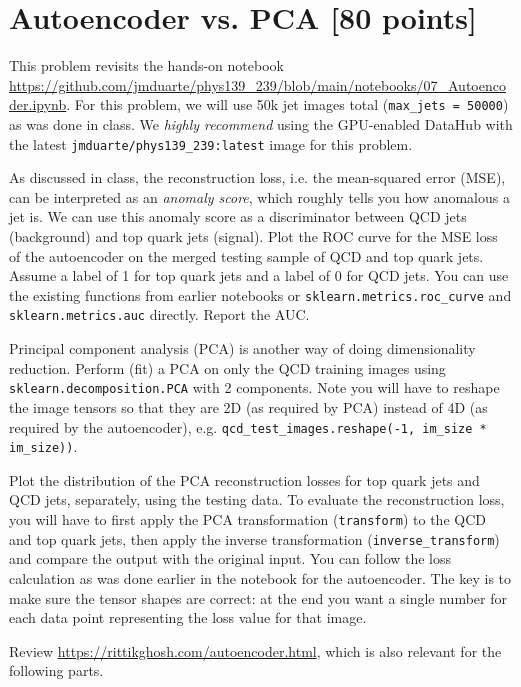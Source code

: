 \newpage
\section{Autoencoder vs. PCA [80 points]}

This problem revisits the hands-on notebook \url{https://github.com/jmduarte/phys139_239/blob/main/notebooks/07_Autoencoder.ipynb}.
For this problem, we will use 50k jet images total (\texttt{max_jets = 50000}) as was done in class.
We \emph{highly recommend} using the GPU-enabled DataHub with the latest \texttt{jmduarte/phys139_239:latest} image for this problem.

\begin{problem}[15]
As discussed in class, the reconstruction loss, i.e. the mean-squared error (MSE), can be interpreted as an \emph{anomaly score}, which roughly tells you how anomalous a jet is.
We can use this anomaly score as a discriminator between QCD jets (background) and top quark jets (signal).
Plot the ROC curve for the MSE loss of the autoencoder on the merged testing sample of QCD and top quark jets.
Assume a label of 1 for top quark jets and a label of 0 for QCD jets.
You can use the existing functions from earlier notebooks or \texttt{sklearn.metrics.roc_curve} and \texttt{sklearn.metrics.auc} directly.
Report the AUC.
\end{problem}


\begin{problem}[25]
Principal component analysis (PCA) is another way of doing dimensionality reduction.
Perform (fit) a PCA on only the QCD training images using \texttt{sklearn.decomposition.PCA} with 2 components.
Note you will have to reshape the image tensors so that they are 2D (as required by PCA) instead of 4D (as required by the autoencoder), e.g. \texttt{qcd_test_images.reshape(-1, im_size * im_size))}.

Plot the distribution of the PCA reconstruction losses for top quark jets and QCD jets, separately, using the testing data.
To evaluate the reconstruction loss, you will have to first apply the PCA transformation (\texttt{transform}) to the QCD and top quark jets, then apply the inverse transformation (\texttt{inverse_transform}) and compare the output with the original input.
You can follow the loss calculation as was done earlier in the notebook for the autoencoder.
The key is to make sure the tensor shapes are correct: at the end you want a single number for each data point representing the loss value for that image.

\begin{hint}
	Review \url{https://rittikghosh.com/autoencoder.html}, which is also relevant for the following parts.
\end{hint}
\end{problem}

